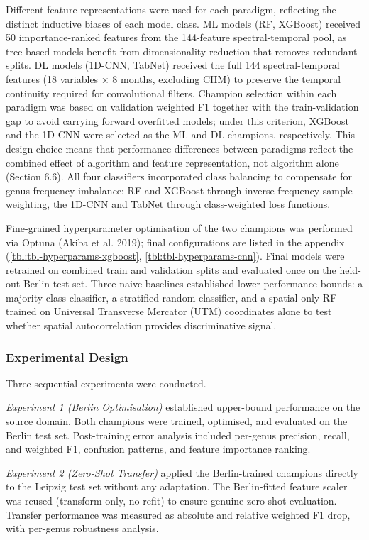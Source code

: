 \documentclass[11pt,a4paper]{scrartcl}
\begin{document}
Different feature representations were used for each paradigm,
reflecting the distinct inductive biases of each model class. ML models
(RF, XGBoost) received 50 importance-ranked features from the
144-feature spectral-temporal pool, as tree-based models benefit from
dimensionality reduction that removes redundant splits. DL models
(1D-CNN, TabNet) received the full 144 spectral-temporal features (18
variables × 8 months, excluding CHM) to preserve the temporal continuity
required for convolutional filters. Champion selection within each
paradigm was based on validation weighted F1 together with the
train-validation gap to avoid carrying forward overfitted models; under
this criterion, XGBoost and the 1D-CNN were selected as the ML and DL
champions, respectively. This design choice means that performance
differences between paradigms reflect the combined effect of algorithm
and feature representation, not algorithm alone (Section 6.6). All four
classifiers incorporated class balancing to compensate for
genus-frequency imbalance: RF and XGBoost through inverse-frequency
sample weighting, the 1D-CNN and TabNet through class-weighted loss
functions.

Fine-grained hyperparameter optimisation of the two champions was
performed via Optuna (Akiba et al. 2019); final configurations are
listed in the appendix (\cref{tbl:tbl-hyperparams-xgboost},
\cref{tbl:tbl-hyperparams-cnn}). Final models were retrained on combined
train and validation splits and evaluated once on the held-out Berlin
test set. Three naive baselines established lower performance bounds: a
majority-class classifier, a stratified random classifier, and a
spatial-only RF trained on Universal Transverse Mercator (UTM)
coordinates alone to test whether spatial autocorrelation provides
discriminative signal.

\subsubsection{Experimental Design}\label{experimental-design}

Three sequential experiments were conducted.

\emph{Experiment 1 (Berlin Optimisation)} established upper-bound
performance on the source domain. Both champions were trained,
optimised, and evaluated on the Berlin test set. Post-training error
analysis included per-genus precision, recall, and weighted F1,
confusion patterns, and feature importance ranking.

\emph{Experiment 2 (Zero-Shot Transfer)} applied the Berlin-trained
champions directly to the Leipzig test set without any adaptation. The
Berlin-fitted feature scaler was reused (transform only, no refit) to
ensure genuine zero-shot evaluation. Transfer performance was measured
as absolute and relative weighted F1 drop, with per-genus robustness
analysis.
\end{document}
